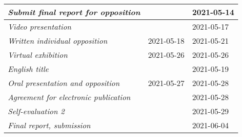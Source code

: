 \begin{center}
\begin{tabular}{|l|l|l|}
        \emph{Submit final report for opposition}   &                   & 2021-05-14        \\ \hline
        \emph{Video presentation}                   &                   & 2021-05-17        \\ \hline
        \emph{Written individual opposition}        & 2021-05-18        & 2021-05-21        \\ \hline
        \emph{Virtual exhibition}                   & 2021-05-26        & 2021-05-26        \\ \hline
        \emph{English title}                        &                   & 2021-05-19        \\ \hline
        \emph{Oral presentation and opposition}     & 2021-05-27        & 2021-05-28        \\ \hline
        \emph{Agreement for electronic publication} &                   & 2021-05-28        \\ \hline
        \emph{Self-evaluation 2}                    &                   & 2021-05-29        \\ \hline
        \emph{Final report, submission}             &                   & 2021-06-04        \\ \hline
    \end{tabular}
\end{center}